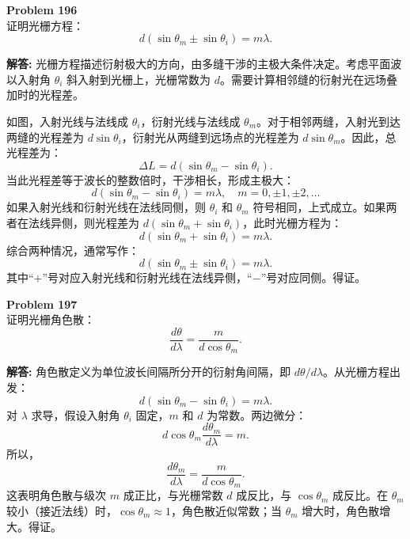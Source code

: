 \documentclass[12pt, a4paper, oneside]{ctexart}
\newenvironment{solution}{\par\noindent\textbf{解答:}\quad}{\par}
\begin{document}
\begin{mdframed}[backgroundcolor=gray!10, linewidth=0pt]
    \textbf{Problem 196} \\
    证明光栅方程：
    \[
    d (\sin\theta_m \pm \sin\theta_i) = m\lambda.
    \]
\end{mdframed}
\begin{solution}
    光栅方程描述衍射极大的方向，由多缝干涉的主极大条件决定。考虑平面波以入射角 $\theta_i$ 斜入射到光栅上，光栅常数为 $d$。需要计算相邻缝的衍射光在远场叠加时的光程差。

    如图，入射光线与法线成 $\theta_i$，衍射光线与法线成 $\theta_m$。对于相邻两缝，入射光到达两缝的光程差为 $d \sin\theta_i$，衍射光从两缝到远场点的光程差为 $d \sin\theta_m$。因此，总光程差为：
    \[
    \Delta L = d (\sin\theta_m - \sin\theta_i).
    \]
    当此光程差等于波长的整数倍时，干涉相长，形成主极大：
    \[
    d (\sin\theta_m - \sin\theta_i) = m\lambda, \quad m=0, \pm1, \pm2, \dots
    \]
    如果入射光线和衍射光线在法线同侧，则 $\theta_i$ 和 $\theta_m$ 符号相同，上式成立。如果两者在法线异侧，则光程差为 $d (\sin\theta_m + \sin\theta_i)$，此时光栅方程为：
    \[
    d (\sin\theta_m + \sin\theta_i) = m\lambda.
    \]
    综合两种情况，通常写作：
    \[
    d (\sin\theta_m \pm \sin\theta_i) = m\lambda.
    \]
    其中“$+$”号对应入射光线和衍射光线在法线异侧，“$-$”号对应同侧。得证。
\end{solution}

\begin{mdframed}[backgroundcolor=gray!10, linewidth=0pt]
    \textbf{Problem 197} \\
    证明光栅角色散：
    \[
    \frac{d\theta}{d\lambda} = \frac{m}{d \cos\theta_m}.
    \]
\end{mdframed}
\begin{solution}
    角色散定义为单位波长间隔所分开的衍射角间隔，即 $d\theta/d\lambda$。从光栅方程出发：
    \[
    d (\sin\theta_m - \sin\theta_i) = m\lambda.
    \]
    对 $\lambda$ 求导，假设入射角 $\theta_i$ 固定，$m$ 和 $d$ 为常数。两边微分：
    \[
    d \cos\theta_m \frac{d\theta_m}{d\lambda} = m.
    \]
    所以，
    \[
    \frac{d\theta_m}{d\lambda} = \frac{m}{d \cos\theta_m}.
    \]
    这表明角色散与级次 $m$ 成正比，与光栅常数 $d$ 成反比，与 $\cos\theta_m$ 成反比。在 $\theta_m$ 较小（接近法线）时，$\cos\theta_m \approx 1$，角色散近似常数；当 $\theta_m$ 增大时，角色散增大。得证。
\end{solution}
\end{document}
